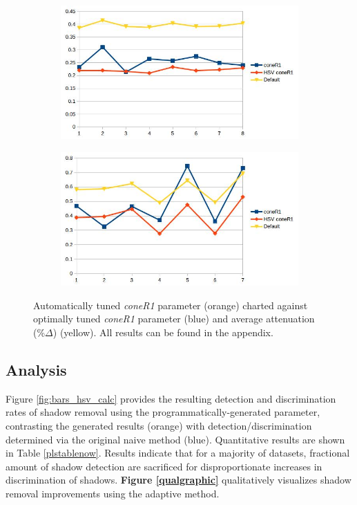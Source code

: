 \documentclass[12pt]{report}
\begin{document}
\begin{figure}
  \centering
  \begin{subfigure}{1\linewidth}
  \includegraphics[width=1\linewidth]{figures/model/highway1_calc_coneR1.jpg}
  \caption{}
\end{subfigure}
\hfill
\begin{subfigure}{1\linewidth}
  \includegraphics[width=1\linewidth]{figures/model/highway3_calc_coneR1.jpg}
  \caption{}
\end{subfigure}

\caption{Automatically tuned \textit{coneR1} parameter (orange) charted against optimally tuned \textit{coneR1} parameter (blue) and average attenuation (\%$\Delta$) (yellow). All results can be found in the appendix.}
\label{fig:new_coneR1}
\end{figure}

\subsection{Analysis}

Figure \ref{fig:bars_hsv_calc} provides the resulting detection and discrimination rates of shadow removal using the programmatically-generated parameter, contrasting the generated results (orange) with detection/discrimination determined via the original naive method (blue). Quantitative results are shown in Table \ref{plstablenow}. Results indicate that for a majority of datasets, fractional amount of shadow detection are sacrificed for disproportionate increases in discrimination of shadows. \textbf{Figure \ref{qualgraphic}} qualitatively visualizes shadow removal improvements using the adaptive method.
\end{document}
